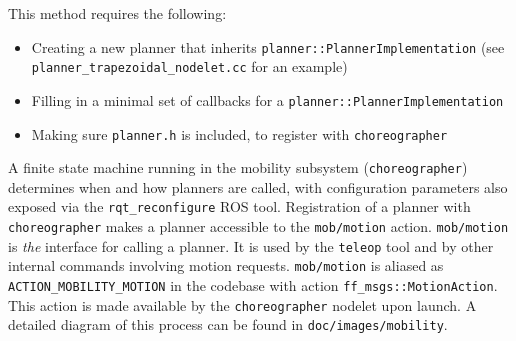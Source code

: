 \documentclass{article}
\begin{document}
This method requires the following:
\begin{itemize}
	\item Creating a new planner that inherits \texttt{planner::PlannerImplementation} (see \texttt{planner\_trapezoidal\_nodelet.cc} for an example)
	\item Filling in a minimal set of callbacks for a \texttt{planner::PlannerImplementation}
	\item Making sure \texttt{planner.h} is included, to register with \texttt{choreographer}
\end{itemize}

A finite state machine running in the mobility subsystem (\texttt{choreographer}) determines when and how planners are called, with configuration parameters also exposed via the \texttt{rqt\_reconfigure} ROS tool. Registration of a planner with \texttt{choreographer} makes a planner accessible to the \texttt{mob/motion} action. \texttt{mob/motion} is \textit{the} interface for calling a planner. It is used by the \texttt{teleop} tool and by other internal commands involving motion requests. \texttt{mob/motion} is aliased as \texttt{ACTION\_MOBILITY\_MOTION} in the codebase with action \texttt{ff\_msgs::MotionAction}. This action is made available by the \texttt{choreographer} nodelet upon launch. A detailed diagram of this process can be found in \texttt{doc/images/mobility}.
\end{document}
